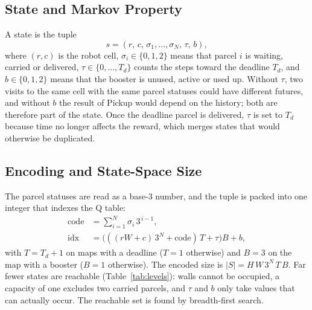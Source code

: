 \documentclass[conference]{IEEEtran}
\begin{document}
\subsection{State and Markov Property}
A state is the tuple
\begin{equation}
s=(r,\,c,\,\sigma_1,\dots,\sigma_N,\,\tau,\,b),\label{eq:state}
\end{equation}
where $(r,c)$ is the robot cell, $\sigma_i\in\{0,1,2\}$ means that parcel $i$ is waiting, carried or delivered, $\tau\in\{0,\dots,T_d\}$ counts the steps toward the deadline $T_d$, and $b\in\{0,1,2\}$ means that the booster is unused, active or used up. Without $\tau$, two visits to the same cell with the same parcel statuses could have different futures, and without $b$ the result of Pickup would depend on the history; both are therefore part of the state. Once the deadline parcel is delivered, $\tau$ is set to $T_d$ because time no longer affects the reward, which merges states that would otherwise be duplicated.

\subsection{Encoding and State-Space Size}
The parcel statuses are read as a base-3 number, and the tuple is packed into one integer that indexes the Q table:
\begin{align}
\mathrm{code}&=\textstyle\sum_{i=1}^{N}\sigma_i\,3^{\,i-1},\\
\mathrm{idx}&=\big(((rW+c)\,3^{N}+\mathrm{code})\,T+\tau\big)B+b,\label{eq:idx}
\end{align}
with $T=T_d+1$ on maps with a deadline ($T=1$ otherwise) and $B=3$ on the map with a booster ($B=1$ otherwise). The encoded size is $|S|=H\,W\,3^{N}\,T\,B$. Far fewer states are reachable (Table~\ref{tab:levels}): walls cannot be occupied, a capacity of one excludes two carried parcels, and $\tau$ and $b$ only take values that can actually occur. The reachable set is found by breadth-first search.
\end{document}
